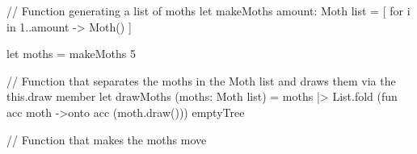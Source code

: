 
// Function generating a list of moths
let makeMoths amount: Moth list =
    [ for i in 1..amount -> Moth() ]

let moths = makeMoths 5


// Function that separates the moths in the Moth list and draws them via the this.draw member
let drawMoths (moths: Moth list) =
    moths
    |> List.fold (fun acc moth ->onto  acc  (moth.draw())) emptyTree

// Function that makes the moths move